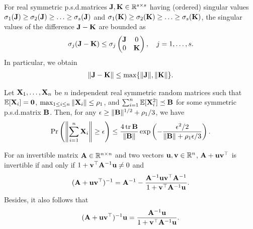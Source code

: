 \documentclass[11pt,a4paper]{article}
\begin{document}
\begin{lemma}\label{lemm:zhao2001}
For real symmetric p.s.d.\@ matrices $\mathbf{J},\mathbf{K} \in \mathbb{R}^{s\times s}$ having (ordered) singular values $\sigma_1(\mathbf{J})\geq\sigma_2(\mathbf{J})\geq \ldots \geq \sigma_s(\mathbf{J})$ and $\sigma_1(\mathbf{K})\geq\sigma_2(\mathbf{K})\geq \ldots \geq \sigma_s(\mathbf{K})$, the singular values of the difference $\mathbf{J}-\mathbf{K}$ are bounded as
\begin{align}
    \sigma_j(\mathbf{J}-\mathbf{K})\leq     \sigma_j \begin{pmatrix}
        \mathbf{J} & 0 \\ 0 &  \mathbf{K}
    \end{pmatrix}, \quad{j=1,\ldots, s}.\nonumber
\end{align}
In particular,  we obtain
\begin{align}
\|\mathbf{J}-\mathbf{K}\|\leq\max\{\|\mathbf{J}\|,\|\mathbf{K}\|\}.\nonumber
\end{align}
\end{lemma}


\begin{lemma} \label{lemm:troop2015}
Let $ \mathbf{X}_1, \ldots, \mathbf{X}_n$ be $n$ independent real symmetric random matrices such that ${\mathbb{E}}[\mathbf{X}_i]= \mathbf{0}$, $\max_{1\leq i \leq n}\|\mathbf{X}_i\|\leq \rho_1$, and $\sum^n_{i=1}{\mathbb{E}}[\mathbf{X}^2_i]\preceq \mathbf{B}$ for some symmetric p.s.d.\@ matrix $\mathbf{B}$. 
Then, for any $\epsilon\geq \|\mathbf{B}\|^{1/2}+\rho_1/3$, we have
\begin{align*}
    \Pr \left( \left\|\sum^n_{i=1}\mathbf{X}_i \right\| \geq\epsilon \right)\leq \frac{4 \operatorname{tr} \mathbf{B}}{ \|\mathbf{B}\| } \exp \left(-\frac{\epsilon^2/2}{\|\mathbf{B}\|+\rho_1\epsilon/3} \right).
\end{align*}
\end{lemma}
 
\begin{lemma}\label{lemm:sherman-morrison}
    For an invertible matrix $\mathbf{A}\in {\mathbb{R}}^{n\times n}$ and two vectors $\mathbf{u}, \mathbf{v} \in {\mathbb{R}}^n$, $\mathbf{A}+\mathbf{u}\mathbf{v}^\top$ is invertible if and only if $1+ \mathbf{v}^\top\mathbf{A}^{-1}\mathbf{u}\neq 0$ and 
    \begin{align}
        (\mathbf{A}+ \mathbf{u}\mathbf{v}^\top)^{-1}=\mathbf{A}^{-1} -\frac{\mathbf{A}^{-1}\mathbf{u}\mathbf{v}^\top\mathbf{A}^{-1}}{1+ \mathbf{v}^\top\mathbf{A}^{-1}\mathbf{u}}. \nonumber
    \end{align}
    Besides, it also follows that
    \begin{align}
        (\mathbf{A}+ \mathbf{u}\mathbf{v}^\top)^{-1}\mathbf{u}=\frac{\mathbf{A}^{-1}\mathbf{u}}{1+ \mathbf{v}^\top\mathbf{A}^{-1}\mathbf{u}}.\nonumber
    \end{align}
\end{lemma}
\end{document}
